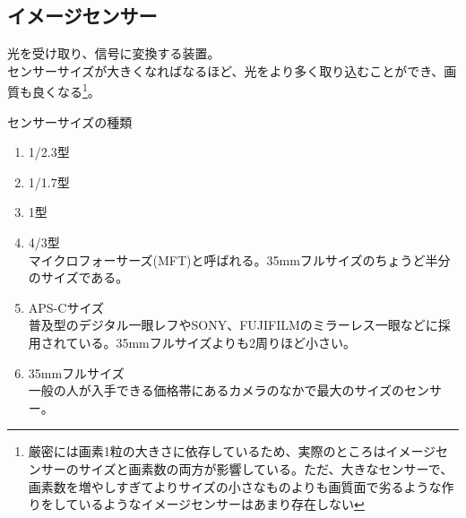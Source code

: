 \documentclass[a4paper]{ltjsreport}
\begin{document}
\subsection{イメージセンサー}
光を受け取り、信号に変換する装置。\\
センサーサイズが大きくなればなるほど、光をより多く取り込むことができ、画質も良くなる\footnote{厳密には画素1粒の大きさに依存しているため、実際のところはイメージセンサーのサイズと画素数の両方が影響している。ただ、大きなセンサーで、画素数を増やしすぎてよりサイズの小さなものよりも画質面で劣るような作りをしているようなイメージセンサーはあまり存在しない}。
\begin{itembox}[l]{センサーサイズの種類}
  \begin{enumerate}
    \item 1/2.3型
    \item 1/1.7型
    \item 1型
    \item 4/3型\\ マイクロフォーサーズ(MFT)と呼ばれる。35mmフルサイズのちょうど半分のサイズである。
    \item APS-Cサイズ\\
          普及型のデジタル一眼レフやSONY、FUJIFILMのミラーレス一眼などに採用されている。35mmフルサイズよりも2周りほど小さい。
    \item 35mmフルサイズ\\
          一般の人が入手できる価格帯にあるカメラのなかで最大のサイズのセンサー。
  \end{enumerate}
\end{itembox}
\end{document}
